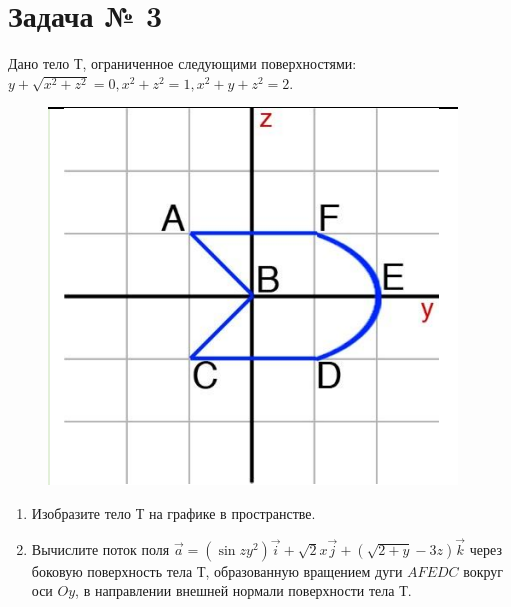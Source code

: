 \section{Задача № 3}

Дано тело Т, ограниченное следующими поверхностями: $y+\sqrt{x^2+z^2}=0, x^2+z^2=1, x^2+y+z^2=2$.

\begin{figure}[!htbp]
  \centering
  \includegraphics[scale=0.5]{images/Input_task3.png}
\end{figure}

\begin{enumerate}
    \item Изобразите тело Т на графике в пространстве.
    \item Вычислите поток поля $\Vec{a} = ( \sin{zy^2})\Vec{i} + \sqrt{2}x\Vec{j} + (\sqrt{2+y}-3z)\Vec{k}$ через боковую поверхность тела Т, образованную вращением дуги $AFEDC$ вокруг оси $Oy$, в направлении внешней нормали поверхности тела Т.
\end{enumerate}

